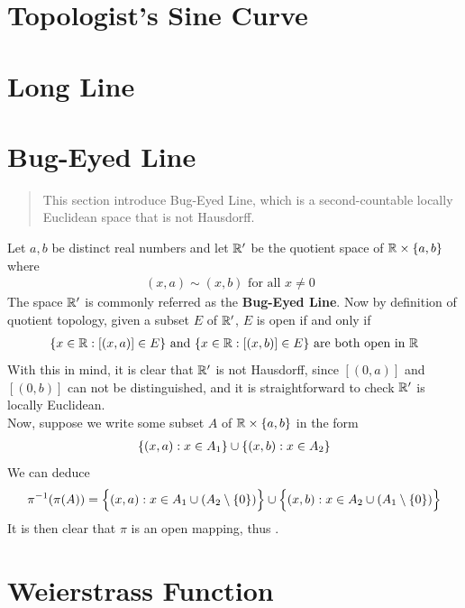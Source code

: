 \documentclass{report}
\begin{document}
\section{Topologist's Sine Curve}
\label{Topologist's Sine Curve}
\section{Long Line}
\label{Long Line}
\section{Bug-Eyed Line}
\label{Bug-Eyed Line}
\begin{abstract}
This section introduce Bug-Eyed Line, which is a second-countable locally Euclidean space that is not Hausdorff.
\end{abstract}
\begin{mdframed}
Let $a,b$ be distinct real numbers and let $\mathbb{R}'$ be the quotient space of $\mathbb{R}\times \{ a,b \}$ where 
\begin{align*}
  (x,a)\sim (x,b)\text{ for all $x\neq 0$ }
\end{align*}
The space $\mathbb{R}'$ is commonly referred as the  \textbf{Bug-Eyed Line}. Now by definition of quotient topology, given a subset $E$ of  $\mathbb{R}'$, $E $ is open if and only if 
\begin{align*}
  \{ x\in\mathbb{R}:[(x,a)]\in E \}\text{ and }\{ x\in\mathbb{R}:[(x,b)]\in E \}\text{ are both open in }\mathbb{R}
\end{align*}
With this in mind, it is clear that $\mathbb{R}'$ is not Hausdorff, since  $[(0,a)]$ and $[(0,b)]$ can not be distinguished, and it is straightforward to check $\mathbb{R}'$ is locally Euclidean.\\


Now, suppose we write some subset $A$ of $\mathbb{R}\times \{ a,b \}$ in the form  
\begin{align*}
\{ (x,a):x \in A_1 \}\cup  \{ (x,b):x \in A_2 \}
\end{align*}
We can deduce
\begin{align*}
\pi^{-1}(\pi (A))=\Big\{ (x,a): x\in A_1 \cup (A_2\setminus \{ 0 \}) \Big\}\cup  \Big\{ (x,b):x \in A_2 \cup  (A_1\setminus \{ 0 \}) \Big\}
\end{align*}
It is then clear that $\pi$ is an open mapping, thus .
\end{mdframed}

\section{Weierstrass Function}
\end{document}
